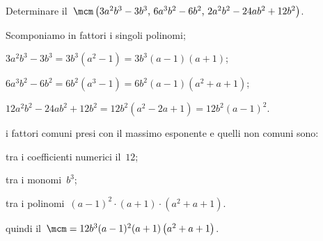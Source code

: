 \begin{exrig}
 \begin{esempio}
Determinare il~$\mcm\left(3a^{2}b^{3}-3b^{3}\text{,~}6a^{3}b^{2}-6b^{2}\text{,~}2a^{2}b^{2}-24ab^{2}+12b^{2}\right)$.
 \begin{itemize*}
 \item Scomponiamo in fattori i singoli polinomi;
  \begin{itemize*}
  \item $3a^{2}b^{3}-3b^{3}=3b^{3}\left(a^{2}-1\right)=3b^{3}(a-1)(a+1)$;
  \item $6a^{3}b^{2}-6b^{2}=6b^{2}\left(a^{3}-1\right)=6b^{2}(a-1)\left(a^{2}+a+1\right)$;
  \item $12a^{2}b^{2}-24ab^{2}+12b^{2}=12b^{2}\left(a^{2}-2a+1\right)=12b^{2}(a-1)^{2}$.
  \end{itemize*}
 \item i fattori comuni presi con il massimo esponente e quelli non comuni sono:
  \begin{itemize*}
  \item tra i coefficienti numerici il~$12$;
  \item tra i monomi~$b^{3}$;
  \item tra i polinomi~$(a-1)^{2}\cdot (a+1)\cdot \left(a^{2}+a+1\right)$.
  \end{itemize*}
 \item quindi il~$\mcm=12b^{3}(a-1)^{2}(a+1)\left(a^{2}+a+1\right)$.
 \end{itemize*}
 \end{esempio}
\end{exrig}

\ovalbox{\risolvii \ref{ese:13.88}, \ref{ese:13.89}, \ref{ese:13.90}, \ref{ese:13.91}, \ref{ese:13.92}, \ref{ese:13.93}, \ref{ese:13.94}, \ref{ese:13.95}, \ref{ese:13.96}, \ref{ese:13.97}, \ref{ese:13.98}, \ref{ese:13.99}}

\newpage


\cleardoublepage
